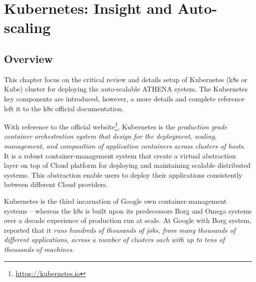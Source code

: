\chapter{Kubernetes: Insight and Auto-scaling}

\label{Chapter4} 

\section{Overview}

This chapter focus on the critical review and details setup of Kubernetes (k8s or Kube) cluster for deploying the auto-scalable ATHENA system. The Kubernetes key components are introduced, however, a more details and complete reference left it to the k8s official documentation\parencite{kubeDoc}.

With reference to the official website\footnote{\url{https://kubernetes.io}}, Kubernetes is the \emph{production grade container orchestration system that design for the deployment, scaling, management, and composition of application containers across clusters of hosts}. It is a robust container-management system that create a virtual abstraction layer on top of Cloud platform for deploying and maintaining scalable distributed systems. This abstraction enable users to deploy their applications consistently between different Cloud providers.


Kubernetes is the third incarnation of Google own container-management systems -- whereas the k8s is built upon its predecessors Borg and Omega \parencite{44843} systems over a decade experience of production run at scale. At Google with Borg system, \parencite{43438} reported that it \emph{runs hundreds of thousands of jobs, from many thousands of different applications, across a number of clusters each with up to tens of thousands of machines}. 


